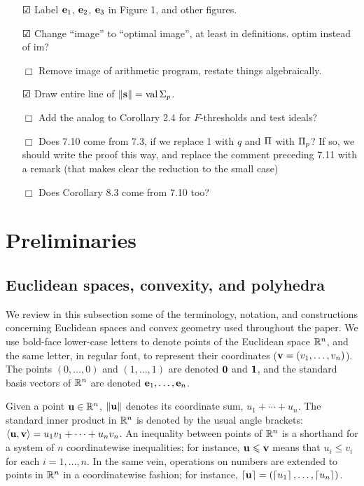 \documentclass[11pt]{amsart}
\begin{document}
{\begin{itemize}
      \item[$\CheckedBox$] Label $\mathbf{e}_1$, $\mathbf{e}_2$, $\mathbf{e}_3$ in Figure 1, and other figures.
      \item[$\CheckedBox$] Change ``image'' to ``optimal image'', at least in definitions. optim instead of im?
      \item[$\Box$] Remove image of arithmetic program, restate things algebraically.

      \item[$\CheckedBox$] Draw entire line of $\| \mathbf{s} \| = \operatorname{val} \Sigma_p$.
      
      \item[$\Box$] Add the analog to Corollary 2.4 for $F$-thresholds and test ideals?
      \item[$\Box$] Does 7.10 come from 7.3, if we replace 1 with $q$ and $\Pi$ with $\Pi_p$? If so, we should write the proof this way, and replace the comment preceding 7.11 with a remark (that makes clear the reduction to the small case)
      \item[$\Box$] Does Corollary 8.3 come from 7.10 too?
   \end{itemize}
}

\newpage
\section{Preliminaries}

\subsection{Euclidean spaces, convexity, and polyhedra}
\label{ss: euclidean spaces and convexity}

We review in this subsection some of the terminology, notation, and constructions concerning Euclidean spaces and convex geometry used throughout the paper.
We use bold-face lower-case letters to denote points of the Euclidean space $\mathbb{R}^n$, and the same letter, in regular font, to represent their coordinates (\eg $\mathbf{v}=(v_1,\ldots,v_n)$).
The points $(0,\ldots,0)$ and $(1,\ldots,1)$ are denoted $\mathbf{0}$ and $\mathbf{1}$, and the standard basis vectors of $\mathbb{R}^n$ are denoted $\mathbf{e}_1,\ldots,\mathbf{e}_n$.

Given a point $\mathbf{u}\in \mathbb{R}^n$, $\| \mathbf{u} \|$ denotes its coordinate sum, $u_1+\cdots+u_n$.
The standard inner product in $\mathbb{R}^n$ is denoted by the usual angle brackets: $\langle \mathbf{u}, \mathbf{v} \rangle = u_1v_1 + \cdots + u_nv_n$.
An inequality between points of $\mathbb{R}^n$ is a shorthand for a system of $n$ coordinatewise inequalities; for instance, $\mathbf{u}\leqslant \mathbf{v}$ means that $u_i \le v_i$ for each $i=1,\ldots,n$.
In the same vein, operations on numbers are extended to points in $\mathbb{R}^n$ in a coordinatewise fashion; for instance, $\left\lceil \mathbf{u} \right\rceil=(\left\lceil u_1 \right\rceil,\ldots,\left\lceil u_n \right\rceil)$.
\end{document}
